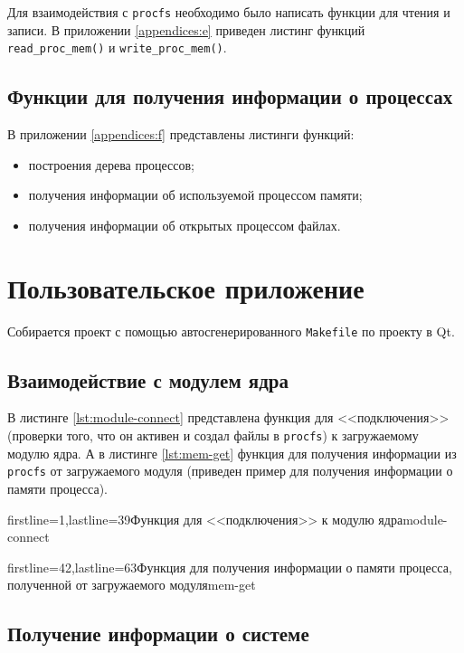 Для взаимодействия с \texttt{procfs} необходимо было написать функции для чтения и записи. В приложении \ref{appendices:e} приведен листинг функций \texttt{read\_proc\_mem()} и \texttt{write\_proc\_mem()}.


\subsection{Функции для получения информации о процессах}

В приложении \ref{appendices:f} представлены листинги функций:

\begin{itemize}
    \item построения дерева процессов;
    \item получения информации об используемой процессом памяти;
    \item получения информации об открытых процессом файлах.
\end{itemize}


\section{Пользовательское приложение}

Собирается проект с помощью автосгенерированного \texttt{Makefile} по проекту в Qt.

\subsection{Взаимодействие с модулем ядра}

В листинге \ref{lst:module-connect} представлена функция для <<подключения>> (проверки того, что он активен и создал файлы в \texttt{procfs}) к загружаемому модулю ядра. А в листинге \ref{lst:mem-get} функция для получения информации из \texttt{procfs} от загружаемого модуля (приведен пример для получения информации о памяти процесса).

    {firstline=1,lastline=39}{Функция для <<подключения>> к модулю ядра}{module-connect}{}

    {firstline=42,lastline=63}{Функция для получения информации о памяти процесса, полученной от загружаемого модуля}{mem-get}{}


\subsection{Получение информации о системе}

